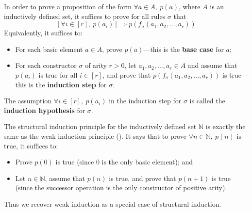 \begin{strategy}
In order to prove a proposition of the form $\forall a \in A,~ p(a)$, where $A$ is an inductively defined set, it suffices to prove for all rules $\sigma$ that
\[ [\forall i \in [r],~ p(a_i)] \Rightarrow p(f_{\sigma}(a_1,a_2,\dots,a_r)) \]
Equivalently, it suffices to:
\begin{itemize}
\item For each basic element $a \in A$, prove $p(a)$---this is the \textbf{base case} for $a$;
\item For each constructor $\sigma$ of arity $r>0$, let $a_1,a_2,\dots,a_r \in A$ and assume that $p(a_i)$ is true for all $i \in [r]$, and prove that $p(f_{\sigma}(a_1,a_2,\dots,a_r))$ is true---this is the \textbf{induction step} for $\sigma$.
\end{itemize}
The assumption $\forall i \in [r],~p(a_i)$ in the induction step for $\sigma$ is called the \textbf{induction hypothesis} for $\sigma$.
\end{strategy}

\begin{example}
The structural induction principle for the inductively defined set $\mathbb{N}$ is exactly the same as the weak induction principle (). It says that to prove $\forall n \in \mathbb{N},~ p(n)$ is true, it suffices to:
\begin{itemize}
\item Prove $p(0)$ is true (since $0$ is the only basic element); and
\item Let $n \in \mathbb{N}$, assume that $p(n)$ is true, and prove that $p(n+1)$ is true (since the successor operation is the only constructor of positive arity).
\end{itemize}
Thus we recover weak induction as a special case of structural induction.
\end{example}

